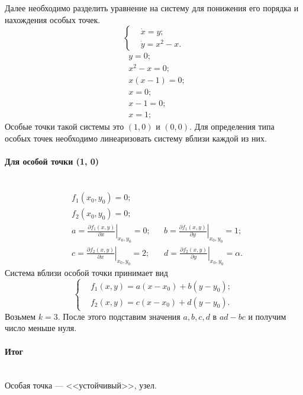 \documentclass[14pt]{extarticle}
\begin{document}
Далее необходимо разделить уравнение на систему для понижения его порядка и нахождения особых точек.
\begin{equation}
  \left\lbrace
  \begin{aligned}
    &\dot{x} = y;\\
    &\dot{y} = x^2-x.
  \end{aligned}
  \right.
\end{equation}
\begin{equation}
  \begin{aligned}
    &y=0;\\
    &x^2-x=0;\\
    &x(x-1)=0;\\
    &x=0;\\
    &x-1=0;\\
    &x=1;
  \end{aligned}
\end{equation}
Особые точки такой системы это $(1, 0)$ и $(0, 0)$. Для определения типа особых точек необходимо линеаризовать систему вблизи каждой из них.

\paragraph{Для особой точки (1, 0)}$\quad$\\
\begin{equation}
  \begin{aligned}
    &f_1(x_0,y_0)=0;\\
    &f_2(x_0,y_0)=0;\\
    &a = \left.\frac{\partial f_1(x,y)}{\partial x}\right|_{x_0,y_0} = 0; && b = \left.\frac{\partial f_1(x,y)}{\partial y}\right|_{x_0,y_0} = 1;\\
    &c = \left.\frac{\partial f_2(x,y)}{\partial x}\right|_{x_0,y_0} =2; && d = \left.\frac{\partial f_2(x,y)}{\partial y}\right|_{x_0,y_0} = \alpha.
  \end{aligned}
\end{equation}
Система вблизи особой точки принимает вид
\begin{equation}
  \left\lbrace
  \begin{aligned}
    &f_1(x,y) = a(x-x_0)+b(y-y_0);\\
    &f_2(x,y) = c(x-x_0)+d(y-y_0).
  \end{aligned}
  \right.
\end{equation}
Возьмем $k=3$. После этого подставим значения $a, b, c, d$ в $ad-bc$ и получим число меньше нуля.
\paragraph{Итог}$\quad$\\
Особая точка --- <<устойчивый>>, узел.
\end{document}
